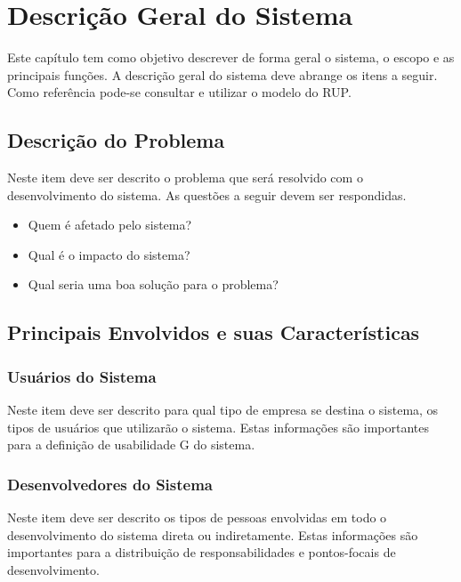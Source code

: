 \chapter{Descrição Geral do Sistema}

Este capítulo tem como objetivo descrever de forma geral o sistema, o escopo e as principais funções. A descrição geral do sistema deve abrange os itens a seguir. Como referência pode-se consultar e utilizar o modelo do RUP.



\section{Descrição do Problema}

Neste item deve ser descrito o problema que será resolvido com o desenvolvimento do sistema. As questões a seguir devem ser respondidas.

\begin{itemize}
	\item Quem é afetado pelo sistema?
	\item Qual é o impacto do sistema?
	\item Qual seria uma boa solução para o problema?
\end{itemize}
	


\section{Principais Envolvidos e suas Características}



\subsection{Usuários do Sistema}

Neste item deve ser descrito para qual tipo de empresa se destina o sistema, os tipos de usuários que utilizarão o sistema.
Estas informações são importantes para a definição de usabilidade G do sistema.

\subsection{Desenvolvedores do Sistema}
Neste item deve ser descrito os tipos de pessoas envolvidas em todo o desenvolvimento do sistema direta ou indiretamente.
Estas informações são importantes para a distribuição de responsabilidades e pontos-focais de desenvolvimento.


